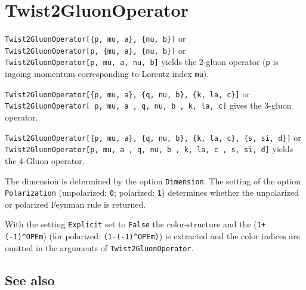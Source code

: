 \documentclass[../FeynCalcManual.tex]{subfiles}
\begin{document}
\hypertarget{twist2gluonoperator}{
\section{Twist2GluonOperator}\label{twist2gluonoperator}}

\texttt{Twist2GluonOperator[\allowbreak{}\{\allowbreak{}p,\ \allowbreak{}mu,\ \allowbreak{}a\},\ \allowbreak{}\{\allowbreak{}nu,\ \allowbreak{}b\}]}
or
\texttt{Twist2GluonOperator[\allowbreak{}p,\ \allowbreak{}\{\allowbreak{}mu,\ \allowbreak{}a\},\ \allowbreak{}\{\allowbreak{}nu,\ \allowbreak{}b\}]}
or
\texttt{Twist2GluonOperator[\allowbreak{}p,\ \allowbreak{}mu,\ \allowbreak{}a,\ \allowbreak{}nu,\ \allowbreak{}b]}
yields the 2-gluon operator (\texttt{p} is ingoing momentum
corresponding to Lorentz index \texttt{mu}).

\texttt{Twist2GluonOperator[\allowbreak{}\{\allowbreak{}p,\ \allowbreak{}mu,\ \allowbreak{}a\},\ \allowbreak{}\{\allowbreak{}q,\ \allowbreak{}nu,\ \allowbreak{}b\},\ \allowbreak{}\{\allowbreak{}k,\ \allowbreak{}la,\ \allowbreak{}c\}]}
or
\texttt{Twist2GluonOperator[\allowbreak{} p,\ \allowbreak{}mu,\ \allowbreak{}a ,\ \allowbreak{}q,\ \allowbreak{}nu,\ \allowbreak{}b ,\ \allowbreak{}k,\ \allowbreak{}la,\ \allowbreak{}c]}
gives the 3-gluon operator.

\texttt{Twist2GluonOperator[\allowbreak{}\{\allowbreak{}p,\ \allowbreak{}mu,\ \allowbreak{}a\},\ \allowbreak{}\{\allowbreak{}q,\ \allowbreak{}nu,\ \allowbreak{}b\},\ \allowbreak{}\{\allowbreak{}k,\ \allowbreak{}la,\ \allowbreak{}c\},\ \allowbreak{}\{\allowbreak{}s,\ \allowbreak{}si,\ \allowbreak{}d\}]}
or
\texttt{Twist2GluonOperator[\allowbreak{}p,\ \allowbreak{}mu,\ \allowbreak{}a ,\ \allowbreak{}q,\ \allowbreak{}nu,\ \allowbreak{}b ,\ \allowbreak{}k,\ \allowbreak{}la,\ \allowbreak{}c ,\ \allowbreak{}s,\ \allowbreak{}si,\ \allowbreak{}d]}
yields the 4-Gluon operator.

The dimension is determined by the option \texttt{Dimension}. The
setting of the option \texttt{Polarization} (unpolarized: \texttt{0};
polarized: \texttt{1}) determines whether the unpolarized or polarized
Feynman rule is returned.

With the setting \texttt{Explicit} set to \texttt{False} the
color-structure and the (\texttt{1+(-1)^OPEm}) (for polarized:
\texttt{(1-(-1)^OPEm)}) is extracted and the color indices are omitted
in the arguments of \texttt{Twist2GluonOperator}.

\subsection{See also}
\end{document}
